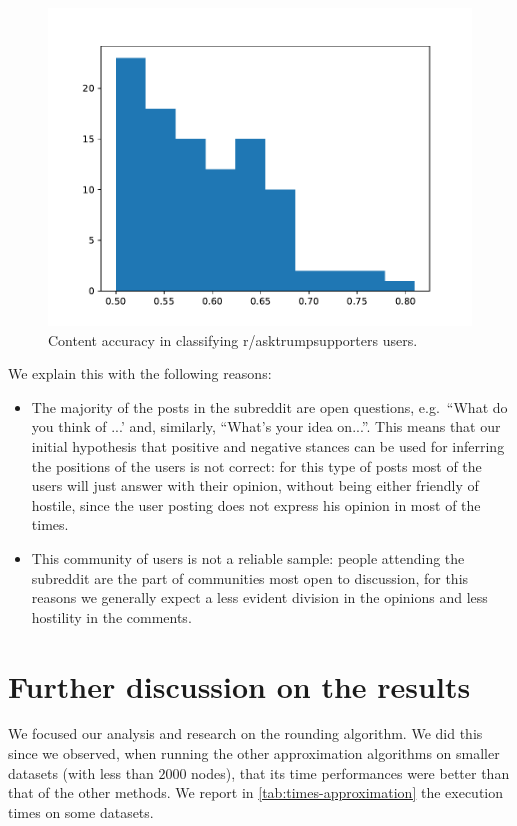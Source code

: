 \begin{figure}
	\centering
	\includegraphics[width=0.6\linewidth]{tex/out/experimental200/experimental200-accuracy-hist.pdf}
	\caption{Content accuracy in classifying r/asktrumpsupporters users.}%
	\label{fig:tex/out/experimental200/experimental200-accuracy-hist}
\end{figure}

We explain this with the following reasons:
\begin{itemize}
	\item The majority of the posts in the subreddit are open questions, e.g.\ ``What
	      do you think of ...' and, similarly, ``What's your idea on...''. This
	      means that our initial hypothesis that positive and negative
	      stances can be used for inferring the positions of
	      the users is not correct: for this type of posts most of the users
	      will just answer with their opinion, without being either friendly of
	      hostile, since the user posting does not express his opinion
	      in most of the times.
	\item This community of users is not a reliable sample: people attending
	      the subreddit are the part of communities most open to discussion, for this
	      reasons we generally expect a less evident division in the opinions and
	      less hostility in the comments.
\end{itemize}

\section{Further discussion on the results}%
\label{sec:discussion}

We focused our analysis and research on the rounding algorithm. We did this
since we observed, when running the other approximation algorithms on smaller datasets
(with less than $2000$ nodes), that its time performances were better than that of the
other methods. We report in \autoref{tab:times-approximation} the execution
times on some datasets.

